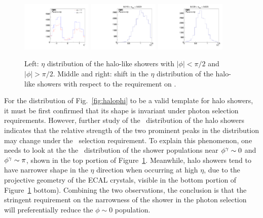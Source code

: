 \begin{figure}[tbp]
  \begin{center}
    \includegraphics[width=0.3\textwidth]{Reconstruction/Figures/halo/halo_eta.pdf}
    \includegraphics[width=0.3\textwidth]{Reconstruction/Figures/halo/halo_shape_etalow.pdf}
    \includegraphics[width=0.3\textwidth]{Reconstruction/Figures/halo/halo_shape_etahigh.pdf}
    \caption{
      Left: $\eta$ distribution of the halo-like showers with $|\phi| < \pi/2$ and $|\phi| > \pi/2$.
      Middle and right: shift in the $\eta$ distribution of the halo-like showers with respect to the requirement on \sieie.
    }
    \label{fig:halo_eta}
  \end{center}
\end{figure}

For the distribution of Fig.~\ref{fig:halophi} to be a valid template for halo showers, it must be first confirmed that its shape is invariant under photon selection requirements. 
However, further study of the \phig\ distribution of the halo showers indicates that the relative strength of the two prominent peaks in the distribution may change under the \sieie\ selection requirement.  
To explain this phenomenon, one needs to look at the the \etag\ distribution of the shower populations near $\phi^{\gamma} \sim 0$ and $\phi^{\gamma} \sim \pi$, shown in the top portion of Figure~\ref{fig:halo_eta}. 
Meanwhile, halo showers tend to have narrower shape in the $\eta$ direction when occurring at high $\eta$, due to the projective geometry of the ECAL crystals, visible in the bottom portion of Figure~\ref{fig:halo_eta} bottom). 
Combining the two observations, the conclusion is that the stringent requirement on the narrowness of the shower in the photon selection will preferentially reduce the $\phi \sim 0$ population.

